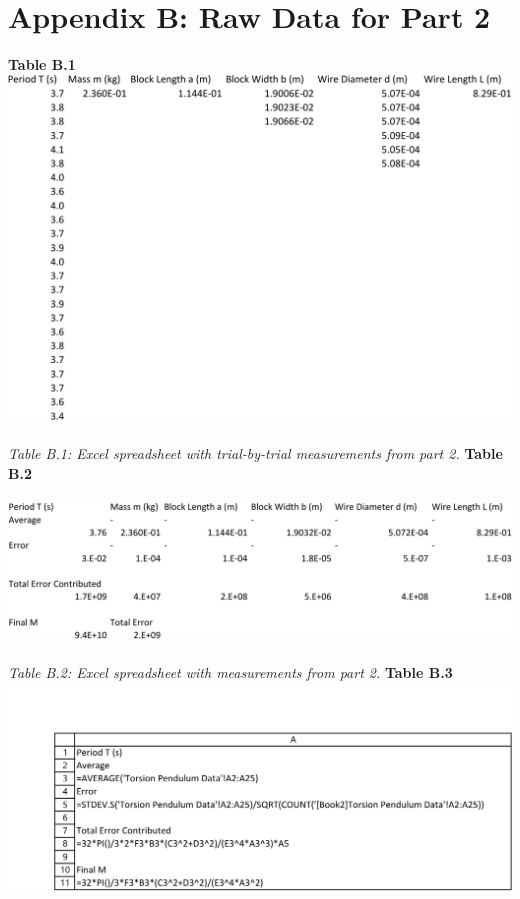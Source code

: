 \documentclass[leqno]{article}
\begin{document}
\section*{Appendix B: Raw Data for Part 2}
\noindent
\textbf{Table B.1}\\
\includegraphics[width=\linewidth]{lab1datab-crop}\\\\
\textit{\small Table B.1: Excel spreadsheet with trial-by-trial measurements from part 2.}
\newpage
\noindent\textbf{Table B.2}\\\\
\includegraphics[width=\linewidth]{lab1datac-crop}\\\\
\textit{\small Table B.2: Excel spreadsheet with measurements from part 2.}
\newpage
\textbf{Table B.3}\\
\includegraphics[width=\linewidth]{lab1datacf1-crop}
\end{document}
